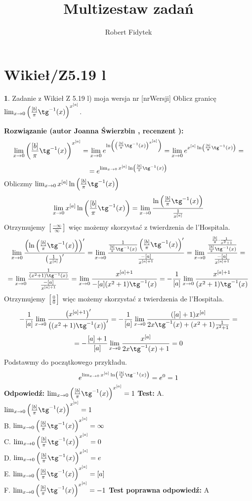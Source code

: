 \documentclass[12pt, a4paper]{article}
\title{Multizestaw zadań}
\author{Robert Fidytek}
\date{}
\theoremstyle{definition} %
\newtheorem{zad}{}
\newcommand{\kategoria}[1]{\section{#1}} %
\newcommand{\zadStart}[1]{\begin{zad}#1\newline} %
\newcommand{\zadStop}{\end{zad}}   %
\newcommand{\rozwStart}[2]{\noindent \textbf{Rozwiązanie (autor #1 , recenzent #2): }\newline} %
\newcommand{\rozwStop}{\newline}                                            %
\newcommand{\odpStart}{\noindent \textbf{Odpowiedź:}\newline}    %
\newcommand{\odpStop}{\newline}                                             %
\newcommand{\testStart}{\noindent \textbf{Test:}\newline} %
\newcommand{\testStop}{\newline} %
\newcommand{\kluczStart}{\noindent \textbf{Test poprawna odpowiedź:}\newline} %
\newcommand{\kluczStop}{\newline} %
\begin{document}
\maketitle


\kategoria{Wikieł/Z5.19 l}
\zadStart{Zadanie z Wikieł Z 5.19 l) moja wersja nr [nrWersji]}
Oblicz granicę $\lim_{x \rightarrow 0} \left( \frac{[b]}{\pi} \tg^{-1}(x) \right)^{x^{[a]}}$.
\zadStop
\rozwStart{Joanna Świerzbin}{}
$$\lim_{x \rightarrow 0} \left( \frac{[b]}{\pi} \tg^{-1}(x) \right)^{x^{[a]}} = 
\lim_{x \rightarrow 0} e^{ \ln\left(\left( \frac{[b]}{\pi} \tg^{-1}(x) \right)^{x^{[a]}}\right)}
= \lim_{x \rightarrow 0} e^{ x^{[a]}\ln\left( \frac{[b]}{\pi} \tg^{-1}(x) \right)} =$$
$$ = e^{ \lim_{x \rightarrow 0} x^{[a]}\ln\left( \frac{[b]}{\pi} \tg^{-1}(x) \right)} $$
Obliczmy ${ \lim_{x \rightarrow 0} x^{[a]}\ln\left( \frac{[b]}{\pi} \tg^{-1}(x) \right)}$
$${ \lim_{x \rightarrow 0} x^{[a]}\ln\left( \frac{[b]}{\pi} \tg^{-1}(x) \right)}
=  \lim_{x \rightarrow 0} \frac{\ln\left( \frac{[b]}{\pi} \tg^{-1}(x) \right)}{\frac{1}{x^{[a]}}}$$
Otrzymujemy $ \left[ \frac{-\infty}{\infty} \right] $ więc możemy skorzystać z twierdzenia de l'Hospitala.
$$\lim_{x \rightarrow 0} \frac{\left(\ln\left(\frac{[b]}{\pi} \tg^{-1}(x) \right)\right)'}{\left(\frac{1}{x^{[a]}}\right)'} 
=\lim_{x \rightarrow 0} \frac{ \frac{1}{\frac{[b]}{\pi} \tg^{-1}(x)} \left(\frac{[b]}{\pi} \tg^{-1}(x)\right)'}{\frac{-[a]}{x^{[a]+1}}} 
=\lim_{x \rightarrow 0} \frac{ \frac{\frac{[b]}{\pi} \cdot \frac{1}{x^2+1}}{\frac{[b]}{\pi} \tg^{-1}(x)} }{\frac{-[a]}{x^{[a]+1}}} =$$
$$=\lim_{x \rightarrow 0} \frac{\frac{1}{(x^2+1)\tg^{-1}(x)}}{\frac{-[a]}{x^{[a]+1}}} =
\lim_{x \rightarrow 0} \frac{x^{[a]+1}}{-[a](x^2+1)\tg^{-1}(x)} =-\frac{1}{[a]} \lim_{x \rightarrow 0} \frac{x^{[a]+1}}{(x^2+1)\tg^{-1}(x)}$$
Otrzymujemy $ \left[ \frac{0}{0} \right] $ więc możemy skorzystać z twierdzenia de l'Hospitala.
$$-\frac{1}{[a]} \lim_{x \rightarrow 0} \frac{\left(x^{[a]+1}\right)'}{\left((x^2+1)\tg^{-1}(x)\right)'} = -\frac{1}{[a]} \lim_{x \rightarrow 0} \frac{([a]+1)x^{[a]}}{2x \tg^{-1}(x)+(x^2+1)\frac{1}{x^2+1}}=$$
$$= -\frac{[a]+1}{[a]} \lim_{x \rightarrow 0} \frac{x^{[a]}}{2x \tg^{-1}(x)+1} = 0 $$
Podstawmy do początkowego przykładu.
$$ e^{ \lim_{x \rightarrow 0} x^{[a]}\ln\left( \frac{[b]}{\pi} \tg^{-1}(x) \right)}=e^0=1$$
\rozwStop
\odpStart
$ \lim_{x \rightarrow 0} \left( \frac{[b]}{\pi} \tg^{-1}(x) \right)^{x^{[a]}} =1 $
\odpStop
\testStart
A. $ \lim_{x \rightarrow 0} \left( \frac{[b]}{\pi} \tg^{-1}(x) \right)^{x^{[a]}} =1 $\\
B. $ \lim_{x \rightarrow 0} \left( \frac{[b]}{\pi} \tg^{-1}(x) \right)^{x^{[a]}} =\infty $\\
C. $ \lim_{x \rightarrow 0} \left( \frac{[b]}{\pi} \tg^{-1}(x) \right)^{x^{[a]}} =0 $\\
D. $ \lim_{x \rightarrow 0} \left( \frac{[b]}{\pi} \tg^{-1}(x) \right)^{x^{[a]}} =e $\\
E. $ \lim_{x \rightarrow 0} \left( \frac{[b]}{\pi} \tg^{-1}(x) \right)^{x^{[a]}} =[a] $\\
F. $ \lim_{x \rightarrow 0} \left( \frac{[b]}{\pi} \tg^{-1}(x) \right)^{x^{[a]}} =-1 $
\testStop
\kluczStart
A
\kluczStop
\end{document}
